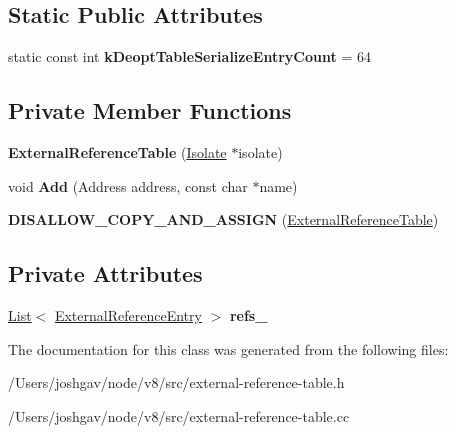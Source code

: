 \subsection*{Static Public Attributes}
\begin{DoxyCompactItemize}
\item 
static const int {\bfseries k\+Deopt\+Table\+Serialize\+Entry\+Count} = 64\hypertarget{classv8_1_1internal_1_1_external_reference_table_af4bea2af9b46fd25c20ce43a1a03d760}{}\label{classv8_1_1internal_1_1_external_reference_table_af4bea2af9b46fd25c20ce43a1a03d760}

\end{DoxyCompactItemize}
\subsection*{Private Member Functions}
\begin{DoxyCompactItemize}
\item 
{\bfseries External\+Reference\+Table} (\hyperlink{classv8_1_1internal_1_1_isolate}{Isolate} $\ast$isolate)\hypertarget{classv8_1_1internal_1_1_external_reference_table_ad56baae4e42a2aeff780363849f02e8f}{}\label{classv8_1_1internal_1_1_external_reference_table_ad56baae4e42a2aeff780363849f02e8f}

\item 
void {\bfseries Add} (Address address, const char $\ast$name)\hypertarget{classv8_1_1internal_1_1_external_reference_table_a1fcca6e4f4b78cb843b15f81f41d3415}{}\label{classv8_1_1internal_1_1_external_reference_table_a1fcca6e4f4b78cb843b15f81f41d3415}

\item 
{\bfseries D\+I\+S\+A\+L\+L\+O\+W\+\_\+\+C\+O\+P\+Y\+\_\+\+A\+N\+D\+\_\+\+A\+S\+S\+I\+GN} (\hyperlink{classv8_1_1internal_1_1_external_reference_table}{External\+Reference\+Table})\hypertarget{classv8_1_1internal_1_1_external_reference_table_ab07715ebf8aafe739d6a963ca2d9c2d3}{}\label{classv8_1_1internal_1_1_external_reference_table_ab07715ebf8aafe739d6a963ca2d9c2d3}

\end{DoxyCompactItemize}
\subsection*{Private Attributes}
\begin{DoxyCompactItemize}
\item 
\hyperlink{classv8_1_1internal_1_1_list}{List}$<$ \hyperlink{structv8_1_1internal_1_1_external_reference_table_1_1_external_reference_entry}{External\+Reference\+Entry} $>$ {\bfseries refs\+\_\+}\hypertarget{classv8_1_1internal_1_1_external_reference_table_a4e61e80a4102db421a370172da7ce696}{}\label{classv8_1_1internal_1_1_external_reference_table_a4e61e80a4102db421a370172da7ce696}

\end{DoxyCompactItemize}


The documentation for this class was generated from the following files\+:\begin{DoxyCompactItemize}
\item 
/\+Users/joshgav/node/v8/src/external-\/reference-\/table.\+h\item 
/\+Users/joshgav/node/v8/src/external-\/reference-\/table.\+cc\end{DoxyCompactItemize}

